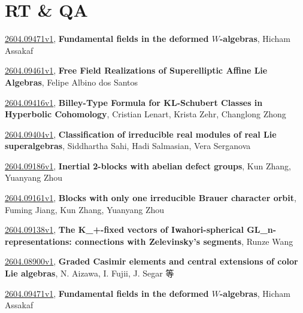 \documentclass[9pt, a4paper]{article}
\theoremstyle{plain}
\theoremstyle{definition}
\theoremstyle{remark}
\newcommand{\arxiv}[3]{\href{https://arxiv.org/abs/#1}{#1}, \textbf{\textcolor{arxivblue}{#2}}, #3}
\begin{document}

\section{RT \& QA}
\arxiv{2604.09471v1}{Fundamental fields in the deformed $W$-algebras}{Hicham Assakaf}

\arxiv{2604.09461v1}{Free Field Realizations of Superelliptic Affine Lie Algebras}{Felipe Albino dos Santos}

\arxiv{2604.09416v1}{Billey-Type Formula for KL-Schubert Classes in Hyperbolic Cohomology}{Cristian Lenart, Krista Zehr, Changlong Zhong}

\arxiv{2604.09404v1}{Classification of irreducible real modules of real Lie superalgebras}{Siddhartha Sahi, Hadi Salmasian, Vera Serganova}

\arxiv{2604.09186v1}{Inertial 2-blocks with abelian defect groups}{Kun Zhang, Yuanyang Zhou}

\arxiv{2604.09161v1}{Blocks with only one irreducible Brauer character orbit}{Fuming Jiang, Kun Zhang, Yuanyang Zhou}

\arxiv{2604.09138v1}{The K_+-fixed vectors of Iwahori-spherical GL_n-representations: connections with Zelevinsky's segments}{Runze Wang}

\arxiv{2604.08900v1}{Graded Casimir elements and central extensions of color Lie algebras}{N. Aizawa, I. Fujii, J. Segar 等}

\arxiv{2604.09471v1}{Fundamental fields in the deformed $W$-algebras}{Hicham Assakaf}

\end{document}
